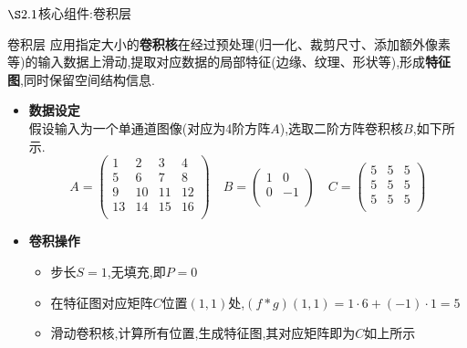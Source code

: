 \documentclass{beamer}
\begin{document}
\begin{frame}{$\S2.1$核心组件:卷积层}
    \begin{block}{卷积层}
        应用指定大小的\textbf{卷积核}在经过预处理(归一化、裁剪尺寸、添加额外像素等)的输入数据上滑动,提取对应数据的局部特征(边缘、纹理、形状等),形成\textbf{特征图},同时保留空间结构信息.
    \end{block}
    \begin{itemize}
    \item \textbf{数据设定}
    \\假设输入为一个单通道图像(对应为4阶方阵$A$),选取二阶方阵卷积核$B$,如下所示.
    \[
        A=
        \begin{pmatrix}
            1&2&3&4\\
            5&6&7&8\\
            9&10&11&12\\
            13&14&15&16\\
        \end{pmatrix}
        \quad B=
        \begin{pmatrix}
            1&0\\
            0&-1\\
        \end{pmatrix}
        \quad C=
        \begin{pmatrix}
            5&5&5\\
            5&5&5\\
            5&5&5\\
        \end{pmatrix}
    \]
    \item \textbf{卷积操作}
      \begin{itemize}
        \item 步长$S=1$,无填充,即$P=0$
        \item 在特征图对应矩阵$C$位置$(1,1)$处,$(f*g)(1,1)=1\cdot 6+(-1)\cdot 1=5$
        \item 滑动卷积核,计算所有位置,生成特征图,其对应矩阵即为$C$如上所示
      \end{itemize}
  \end{itemize}
\end{frame}
\end{document}
